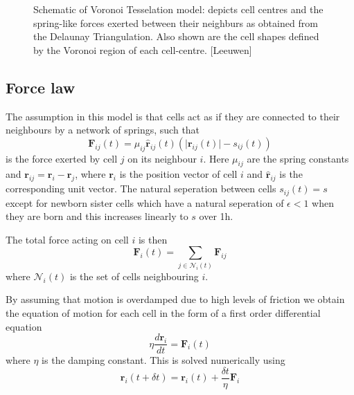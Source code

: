 \documentclass[a4paper]{article}
\begin{document}
\begin{figure}[htbp]
	\centering
	\caption{Schematic of Voronoi Tesselation model: depicts cell centres and the spring-like forces exerted between their neighburs as obtained from the Delaunay Triangulation. Also shown are the cell shapes defined by the Voronoi region of each cell-centre. [Leeuwen]}
	\label{fig:spring}
\end{figure} 
\subsection{Force law}
The assumption in this model is that cells act as if they are connected to their neighbours by a network of springs, such that 
\begin{equation} \mathbf{F}_{ij}(t) = \mu_{ij}\hat{\mathbf{r}}_{ij}(t)(\vert \mathbf{r}_{ij}(t) \vert -s_{ij}(t))
	\end{equation}
is the force exerted by cell $j$ on its neighbour $i$. Here $\mu_{ij}$ are the spring constants and $\mathbf{r}_{ij}=\mathbf{r}_{i}-\mathbf{r}_ {j}$, where $\mathbf{r}_i$ is the position vector of cell $i$ and $\hat{\mathbf{r}}_{ij}$ is the corresponding unit vector. The natural seperation between cells $s_{ij}(t)=s$ except for newborn sister cells which have a natural seperation of $\epsilon < 1$ when they are born and this increases linearly to $s$ over 1h.

The total force acting on cell $i$ is then
\begin{equation}
	\mathbf{F}_i(t)= \sum_{j \in \mathcal{N}_i(t)}\mathbf{F}_{ij}
\end{equation}
where $\mathcal{N}_i(t)$ is the set of cells neighbouring $i$.

By assuming that motion is overdamped due to high levels of friction we obtain the equation of motion for each cell in the form of a first order differential equation
\begin{equation}
	\eta \frac{d\mathbf{r}_i}{dt}= \mathbf{F}_i(t)
\end{equation}
where $\eta$ is the damping constant. This is solved numerically using
\begin{equation}
	\mathbf{r}_i(t+\delta t)= \mathbf{r}_i(t)+\frac{\delta t}{\eta} \mathbf{F}_i
\end{equation}
\end{document}
